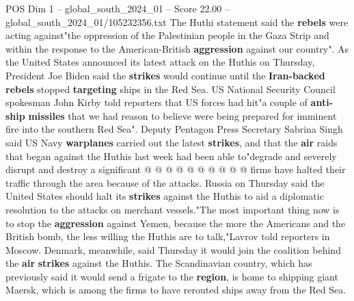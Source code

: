 \begin{textsample}{POS Dim 1 – global\_south\_2024\_01 – Score 22.00 – global\_south\_2024\_01/105232356.txt}
The Huthi statement said the \textbf{rebels} were acting against"the oppression of the Palestinian people in the Gaza Strip and within the response to the American-British \textbf{aggression} against our country".
As the United States announced its latest attack on the Huthis on Thursday, President Joe Biden said the \textbf{strikes} would continue until the \textbf{Iran-backed} \textbf{rebels} stopped \textbf{targeting} ships in the Red Sea.
US National Security Council spokesman John Kirby told reporters that US forces had hit"a couple of \textbf{anti-ship} \textbf{missiles} that we had reason to believe were being prepared for imminent fire into the southern Red Sea".
Deputy Pentagon Press Secretary Sabrina Singh said US Navy \textbf{warplanes} carried out the latest \textbf{strikes}, and that the \textbf{air} raids that began against the Huthis last week had been able to"degrade and severely disrupt and destroy a significant @ @ @ @ @ @ @ @ @ @ firms have halted their traffic through the area because of the attacks.
Russia on Thursday said the United States should halt its \textbf{strikes} against the Huthis to aid a diplomatic resolution to the attacks on merchant vessels."The most important thing now is to stop the \textbf{aggression} against Yemen, because the more the Americans and the British bomb, the less willing the Huthis are to talk,"Lavrov told reporters in Moscow.
Denmark, meanwhile, said Thursday it would join the coalition behind the \textbf{air} \textbf{strikes} against the Huthis.
The Scandinavian country, which has previously said it would send a frigate to the \textbf{region}, is home to shipping giant Maersk, which is among the firms to have rerouted ships away from the Red Sea.

\end{textsample}
